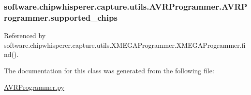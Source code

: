 \subsubsection[{supported\+\_\+chips}]{\setlength{\rightskip}{0pt plus 5cm}software.\+chipwhisperer.\+capture.\+utils.\+A\+V\+R\+Programmer.\+A\+V\+R\+Programmer.\+supported\+\_\+chips}\label{classsoftware_1_1chipwhisperer_1_1capture_1_1utils_1_1AVRProgrammer_1_1AVRProgrammer_a26128a56c0884b06659f8fc94bbbc010}


Referenced by software.\+chipwhisperer.\+capture.\+utils.\+X\+M\+E\+G\+A\+Programmer.\+X\+M\+E\+G\+A\+Programmer.\+find().



The documentation for this class was generated from the following file\+:\begin{DoxyCompactItemize}
\item 
\hyperlink{AVRProgrammer_8py}{A\+V\+R\+Programmer.\+py}\end{DoxyCompactItemize}

